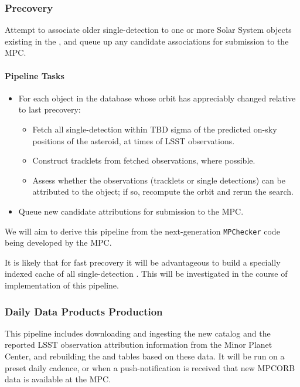 \subsubsection{Precovery}
\label{sec:mops:precovery}

Attempt to associate older single-detection \DIAObjects to one or more Solar System objects existing in the \MPCORB, and queue up any candidate associations for submission to the MPC.

\paragraph{Pipeline Tasks}

\begin{itemize}
	\item For each object in the \MPCORB database whose orbit has appreciably changed relative to last precovery:
	\begin{itemize}
		\item Fetch all single-detection \DIAObjects within TBD sigma of the predicted on-sky positions of the asteroid, at times of LSST observations.
		\item Construct tracklets from fetched observations, where possible.
		\item Assess whether the observations (tracklets or single detections) can be attributed to the object; if so, recompute the orbit and rerun the search.
	\end{itemize}
	\item Queue new candidate attributions for submission to the MPC.
\end{itemize}

We will aim to derive this pipeline from the next-generation {\tt MPChecker} code being developed by the MPC.

It is likely that for fast precovery it will be advantageous to build a specially indexed cache of all single-detection \DIAObjects. This will be investigated in the course of implementation of this pipeline.

\subsubsection{Daily Data Products Production}

This pipeline includes downloading and ingesting the new \MPCORB catalog and the reported LSST observation attribution information from the Minor Planet Center, and rebuilding the \SSObject and \SSSource tables based on these data. It will be run on a preset daily cadence, or when a push-notification is received that new MPCORB data is available at the MPC.

